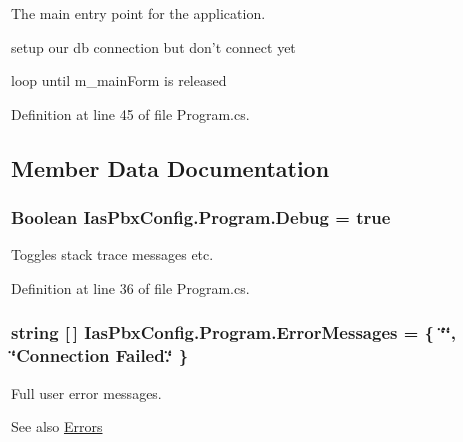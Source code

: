 The main entry point for the application. 

setup our db connection but don't connect yet

loop until m\_\-mainForm is released 

Definition at line 45 of file Program.cs.

\subsection{Member Data Documentation}
\hypertarget{class_ias_pbx_config_1_1_program_a6271cbd5697b7b8d3d8df052841389ab}{
\subsubsection[{Debug}]{\setlength{\rightskip}{0pt plus 5cm}Boolean {\bf IasPbxConfig.Program.Debug} = true}}
\label{class_ias_pbx_config_1_1_program_a6271cbd5697b7b8d3d8df052841389ab}


Toggles stack trace messages etc. 

Definition at line 36 of file Program.cs.\hypertarget{class_ias_pbx_config_1_1_program_a914e91efe69f6c3856d81120624ba66d}{
\subsubsection[{ErrorMessages}]{\setlength{\rightskip}{0pt plus 5cm}string \mbox{[}$\,$\mbox{]} {\bf IasPbxConfig.Program.ErrorMessages} = \{ \char`\"{}\char`\"{}, \char`\"{}Connection Failed.\char`\"{} \}}}
\label{class_ias_pbx_config_1_1_program_a914e91efe69f6c3856d81120624ba66d}


Full user error messages. \begin{DoxySeeAlso}{See also}
\hyperlink{namespace_ias_pbx_config_afbeaf23ebc85892dc4c2cb09f7f2a0cb}{Errors} 
\end{DoxySeeAlso}


